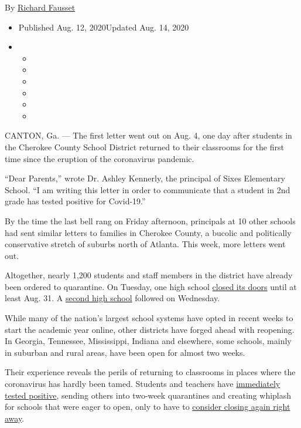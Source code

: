 By \href{https://www.nytimes3xbfgragh.onion/by/richard-fausset}{Richard
Fausset}

\begin{itemize}
\item
  Published Aug. 12, 2020Updated Aug. 14, 2020
\item
  \begin{itemize}
  \item
  \item
  \item
  \item
  \item
  \item
  \end{itemize}
\end{itemize}

CANTON, Ga. --- The first letter went out on Aug. 4, one day after
students in the Cherokee County School District returned to their
classrooms for the first time since the eruption of the coronavirus
pandemic.

``Dear Parents,'' wrote Dr. Ashley Kennerly, the principal of Sixes
Elementary School. ``I am writing this letter in order to communicate
that a student in 2nd grade has tested positive for Covid-19.''

By the time the last bell rang on Friday afternoon, principals at 10
other schools had sent similar letters to families in Cherokee County, a
bucolic and politically conservative stretch of suburbs north of
Atlanta. This week, more letters went out.

Altogether, nearly 1,200 students and staff members in the district have
already been ordered to quarantine. On Tuesday, one high school
\href{https://www.cherokeek12.net/News/81120message\#sthash.LNefigAz.dpbs}{closed
its doors} until at least Aug. 31. A
\href{https://www.cherokeek12.net/News/81220message\#sthash.YR2pGNJt.dpbs}{second
high school} followed on Wednesday.

While many of the nation's largest school systems have opted in recent
weeks to start the academic year online, other districts have forged
ahead with reopening. In Georgia, Tennessee, Mississippi, Indiana and
elsewhere, some schools, mainly in suburban and rural areas, have been
open for almost two weeks.

Their experience reveals the perils of returning to classrooms in places
where the coronavirus has hardly been tamed. Students and teachers have
\href{https://www.nytimes3xbfgragh.onion/2020/08/01/us/schools-reopening-indiana-coronavirus.html}{immediately
tested positive}, sending others into two-week quarantines and creating
whiplash for schools that were eager to open, only to have to
\href{https://www.nytimes3xbfgragh.onion/2020/08/03/us/school-closing-coronavirus.html}{consider
closing again right away}.

